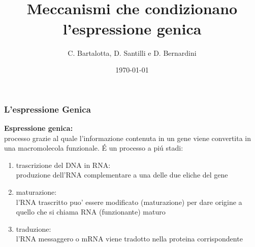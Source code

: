 \documentclass[hyperref={pdfpagelabels=false}]{beamer}
\title{\\Meccanismi che condizionano l'espressione genica\\}
\author{ C. Bartalotta, D. Santilli e D. Bernardini}
\date{\today}
\begin{document}


\begin{frame}
\titlepage
\end{frame}



\begin{frame}\frametitle{L'espressione Genica}
\textbf{Espressione genica:}\\
processo grazie al quale l'informazione contenuta in un gene viene convertita in una macromolecola funzionale.
\'E un processo a pi\'u stadi:\pause 
\begin{enumerate}
\item trascrizione del DNA in RNA:\\
produzione dell'RNA complementare a una delle due eliche del gene  \pause 
\item maturazione:\\
l'RNA trascritto puo' essere modificato (maturazione) per dare origine a quello che si chiama RNA (funzionante) maturo \pause 
\item traduzione:\\
l'RNA messaggero o mRNA viene tradotto nella proteina corrispondente
\end{enumerate}
\end{frame}
\end{document}
